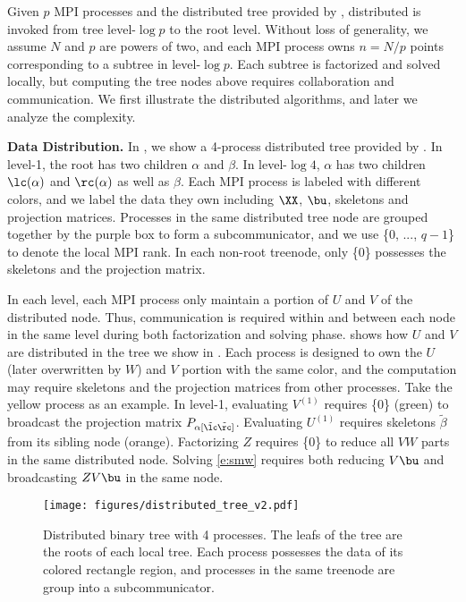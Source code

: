 Given $p$ MPI processes and the distributed tree provided by \ASKIT{}, 
distributed \IASKIT{} is invoked from tree level-$\log{p}$ to the
root level. Without loss of generality, we assume $N$ and $p$ are powers 
of two, and each MPI process owns $n=N/p$ points corresponding to a 
subtree in level-$\log{p}$.
Each subtree is factorized and solved locally, but computing the tree nodes
above requires collaboration and communication.
We first illustrate the distributed algorithms, and later we analyze the
complexity. 

\textbf{Data Distribution.}
In , we show a 4-process distributed tree provided
by \ASKIT{}. In level-1, the root has two children $\alpha$ and $\beta$.
In level-$\log{4}$, $\alpha$ has two children $\lc(\alpha)$ and $\rc(\alpha)$
as well as $\beta$.
Each MPI process is labeled with different colors, and we label the
data they own including $\XX$, $\bu$, skeletons and projection matrices.
Processes in the same distributed tree node are grouped together
by the purple box to form a subcommunicator, and we use 
\{0, ..., $q-1$\} to denote the local MPI rank. 
In each non-root treenode, only \{0\} possesses the skeletons
and the projection matrix.

In each level, each MPI process only maintain a portion of 
$U$ and $V$ of the distributed node.
Thus, communication is required within and between each node in the 
same level during both factorization and solving phase.
 shows how $U$ and $V$ are distributed in the
tree we show in .
Each process is designed to own the $U$ (later overwritten by $W$) 
and $V$ portion with the same color, and the computation may require 
skeletons and the projection matrices from other processes.
Take the yellow process as an example.
In level-1, evaluating $V^{(1)}$ requires \{0\} (green) to broadcast the 
projection matrix $P_{\alpha[\tilde{\lc}\tilde{\rc}]}$. 
Evaluating $U^{(1)}$ requires skeletons $\tilde{\beta}$ from 
its sibling node (orange).
Factorizing $Z$ requires \{0\} to reduce all $VW$
parts in the same distributed node.
Solving \eqref{e:smw} requires both reducing $V\bu$ and broadcasting
$ZV\bu$ in the same node.  

\begin{figure}[!t]
  \centering
  \texttt{[image: figures/distributed\_tree\_v2.pdf]}
  \caption{Distributed binary tree with 4 processes. The leafs of the 
  tree are the roots of each local tree.
  Each process possesses the data of its colored rectangle 
  region, and processes in the same treenode are group into
  a subcommunicator.}
  \label{fig:tree}
\end{figure}

